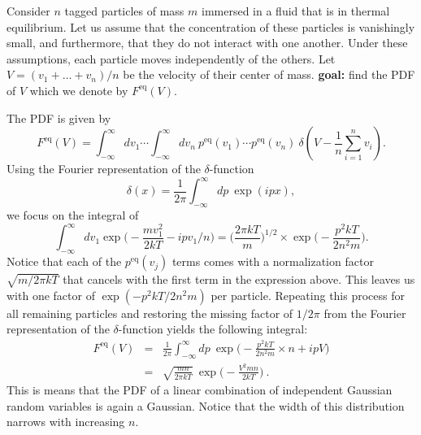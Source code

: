 
Consider $n$ tagged particles of mass $m$ immersed in a fluid that is in thermal equilibrium. Let us assume that the concentration of these particles is vanishingly small, and furthermore, that they do not interact with one another. Under these assumptions, each particle moves independently of the others. Let $V = (v_1 + \ldots + v_n)/n$ be the velocity of their center of mass. \textbf{goal:} find the PDF of $V$ which we denote by $F^\text{eq}(V)$.

The PDF is given by
\begin{equation}
F^\text{eq}(V) = \int_{-\infty}^{\infty} dv_1 \cdots \int_{-\infty}^{\infty} dv_n ~ p^\text{eq}(v_1) \cdots p^\text{eq}(v_n) ~ \delta(V - \frac{1}{n}\sum_{i=1}^{n} v_i).
\end{equation}
Using the Fourier representation of the $\delta$-function
\begin{equation}
\delta(x) = \frac{1}{2\pi} \int_{-\infty}^{\infty} dp ~ \exp(i p x),
\end{equation}
we focus on the integral of 
\begin{equation}
\int_{-\infty}^{\infty} dv_1 \exp\bigg(-\frac{m v_1^2}{2 k T} -i p v_1/n\bigg) =  \bigg( \frac{2\pi k T}{m}\bigg)^{1/2} \times \exp\bigg(-\frac{p^2 k T }{2 n^2 m}\bigg).
\end{equation}
Notice that each of the $p^\text{eq}(v_j)$ terms comes with a normalization factor $\sqrt{m/2 \pi k T}$ that cancels with the first term in the expression above. This leaves us with one factor of $\exp(-p^2 k T/2 n^2 m)$ per particle. Repeating this process for all remaining particles and restoring the missing factor of $1/2\pi$ from the Fourier representation of the $\delta$-function yields the following integral:
\begin{eqnarray}
F^\text{eq}(V) &=& \frac{1}{2\pi}\int_{-\infty}^{\infty} dp ~ \exp\bigg(-\frac{p^2 k T }{2 n^2 m} \times n + i p V\bigg)\\
&=&  \boxed{\sqrt{\frac{m n}{2\pi k T}} ~ \exp\bigg(-\frac{V^2 m n }{2 k T} \bigg)}~.
\end{eqnarray}
This is means that the PDF of a linear combination of independent Gaussian random variables is again a Gaussian. Notice that the width of this distribution narrows with increasing $n$.